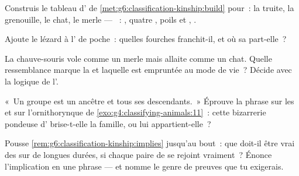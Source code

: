 \begin{exercise}[$\star\star$]\label{exo:g6:classification-kinship:8}
Construis le tableau d' de
\cref{met:g6:classification-kinship:build} pour~: la truite, la
grenouille, le chat, le merle --- ~: ,
quatre , poils et , .
\end{exercise}

\begin{exercise}[$\star\star$]\label{exo:g6:classification-kinship:9}
Ajoute le lézard à l' de poche~: quelles fourches
franchit-il, et où sa  part-elle~?
\end{exercise}

\begin{exercise}[$\star\star$]\label{exo:g6:classification-kinship:10}
La chauve-souris vole comme un merle mais allaite comme un chat.
Quelle ressemblance marque la  et laquelle est empruntée au
mode de vie~? Décide avec la logique de l'.
\end{exercise}

\begin{exercise}[$\star\star$]\label{exo:g6:classification-kinship:11}
«~Un groupe est un ancêtre et tous ses descendants.~» Éprouve la
phrase sur les  et sur l'ornithorynque de
\cref{exo:g4:classifying-animals:11}~: cette bizarrerie pondeuse
d' brise-t-elle la famille, ou lui appartient-elle~?
\end{exercise}

\begin{exercise}[$\star\star\star$]\label{exo:g6:classification-kinship:12}
Pousse \cref{rem:g6:classification-kinship:implies} jusqu'au bout~:
que doit-il être vrai des  sur de longues durées, si chaque
paire de  se rejoint vraiment~? Énonce l'implication en une
phrase --- et nomme le genre de preuves que tu exigerais.
\end{exercise}

